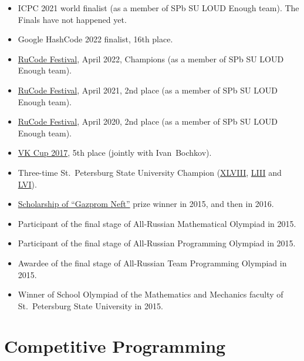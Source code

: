\documentclass[a4paper, 11pt]{article}
\begin{document}
\begin{itemize}
	\item ICPC 2021 world finalist (as a member of SPb SU LOUD Enough team). The Finals have not happened yet.

	\item Google HashCode 2022 finalist, 16th place.

	\item \href{https://rucode.net/kak-eto-bylo/}{RuCode Festival}, April 2022, Champions (as a member of SPb SU LOUD Enough team).

	\item \href{https://rucode.net/kak-eto-bylo/}{RuCode Festival}, April 2021, 2nd place (as a member of SPb SU LOUD Enough team).

	\item \href{http://rucode.it-edu.mipt.ru/rucode2020resAB}{RuCode Festival}, April 2020, 2nd place (as a member of SPb SU LOUD Enough team).

	\item \href{https://codeforces.com/blog/entry/53192}{VK Cup 2017}, 5th place (jointly with Ivan~Bochkov).

	\item Three-time St.~Petersburg State University Champion (\href{https://acm.math.spbu.ru/cgi-bin/monitor.pl/n171015.dat}{XLVIII}, \href{https://acm.math.spbu.ru/cgi-bin/monitor.pl/n190421.dat}{LIII} and \href{https://acm.math.spbu.ru/cgi-bin/monitor.pl/n201206.dat}{LVI}).

	\item \href{https://math-cs.spbu.ru/en/scholarships-rodnye-goroda/}{Scholarship of ``Gazprom Neft''} prize winner in 2015, and then in 2016.

	\item Participant of the final stage of All-Russian Mathematical Olympiad in 2015.

	\item Participant of the final stage of All-Russian Programming Olympiad in 2015.

	\item Awardee of the final stage of All-Russian Team Programming Olympiad in 2015.

	\item Winner of School Olympiad of the Mathematics and Mechanics faculty of St.~Petersburg State University in 2015.
\end{itemize}

\section*{Competitive Programming}
\end{document}
